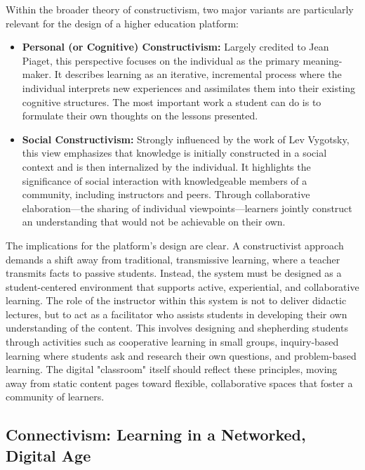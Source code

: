 \documentclass{article}
\begin{document}
Within the broader theory of constructivism, two major variants are particularly relevant for the design of a higher education platform:
\begin{itemize}
    \item \textbf{Personal (or Cognitive) Constructivism:} Largely credited to Jean Piaget, this perspective focuses on the individual as the primary meaning-maker.\cite{13, 17} It describes learning as an iterative, incremental process where the individual interprets new experiences and assimilates them into their existing cognitive structures.\cite{17} The most important work a student can do is to formulate their own thoughts on the lessons presented.\cite{12}
    \item \textbf{Social Constructivism:} Strongly influenced by the work of Lev Vygotsky, this view emphasizes that knowledge is initially constructed in a social context and is then internalized by the individual.\cite{13, 16} It highlights the significance of social interaction with knowledgeable members of a community, including instructors and peers.\cite{13, 14} Through collaborative elaboration—the sharing of individual viewpoints—learners jointly construct an understanding that would not be achievable on their own.\cite{13}
\end{itemize}

The implications for the platform's design are clear. A constructivist approach demands a shift away from traditional, transmissive learning, where a teacher transmits facts to passive students.\cite{14} Instead, the system must be designed as a student-centered environment that supports active, experiential, and collaborative learning.\cite{14} The role of the instructor within this system is not to deliver didactic lectures, but to act as a facilitator who assists students in developing their own understanding of the content.\cite{13, 15} This involves designing and shepherding students through activities such as cooperative learning in small groups, inquiry-based learning where students ask and research their own questions, and problem-based learning.\cite{12, 14, 17} The digital "classroom" itself should reflect these principles, moving away from static content pages toward flexible, collaborative spaces that foster a community of learners.\cite{14}

\subsection{Connectivism: Learning in a Networked, Digital Age}
\end{document}
